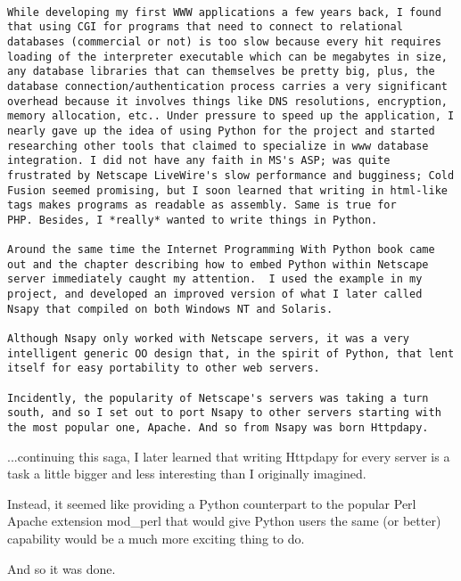 \begin{verbatim}

While developing my first WWW applications a few years back, I found
that using CGI for programs that need to connect to relational
databases (commercial or not) is too slow because every hit requires
loading of the interpreter executable which can be megabytes in size,
any database libraries that can themselves be pretty big, plus, the
database connection/authentication process carries a very significant
overhead because it involves things like DNS resolutions, encryption,
memory allocation, etc.. Under pressure to speed up the application, I
nearly gave up the idea of using Python for the project and started
researching other tools that claimed to specialize in www database
integration. I did not have any faith in MS's ASP; was quite
frustrated by Netscape LiveWire's slow performance and bugginess; Cold
Fusion seemed promising, but I soon learned that writing in html-like
tags makes programs as readable as assembly. Same is true for
PHP. Besides, I *really* wanted to write things in Python.

Around the same time the Internet Programming With Python book came
out and the chapter describing how to embed Python within Netscape
server immediately caught my attention.  I used the example in my
project, and developed an improved version of what I later called
Nsapy that compiled on both Windows NT and Solaris.

Although Nsapy only worked with Netscape servers, it was a very
intelligent generic OO design that, in the spirit of Python, that lent
itself for easy portability to other web servers.

Incidently, the popularity of Netscape's servers was taking a turn
south, and so I set out to port Nsapy to other servers starting with
the most popular one, Apache. And so from Nsapy was born Httpdapy.

\end{verbatim}

...continuing this saga, I later learned that writing Httpdapy for
every server is a task a little bigger and less interesting than I
originally imagined.

Instead, it seemed like providing a Python counterpart to the popular
Perl Apache extension mod_perl that would give Python users the same
(or better) capability would be a much more exciting thing to do.

And so it was done. 


